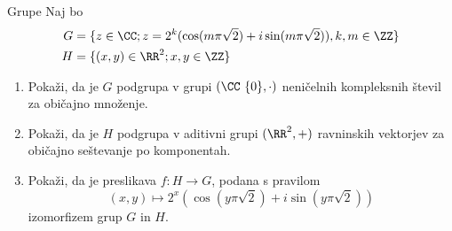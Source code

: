 \begin{frame}{Grupe}
	Naj bo
	\begin{align*}
		G &= \{z\in \CC; z = 2^k (\cos(m\pi\sqrt{2})+ i\sin(m\pi\sqrt{2})),k,m\in \ZZ\}\\
	    H &= \{(x,y) \in \RR^2; x,y \in \ZZ\}
	\end{align*}
	\begin{enumerate}
		\item
			Pokaži, da je $G$ podgrupa v grupi \((\CC \ \{0\}, \cdot)\)
			neničelnih kompleksnih števil za običajno množenje.
		\item
			Pokaži, da je $H$ podgrupa v aditivni grupi \((\RR^2, +)\)
			ravninskih vektorjev za običajno seštevanje po komponentah.
		\item
			Pokaži, da je preslikava $f:H\to G$, podana s pravilom
			\[(x,y) \mapsto 2^x (\cos(y\pi \sqrt{2})+ i\sin(y\pi \sqrt{2})) \]
			izomorfizem grup $G$ in $H$.
	\end{enumerate}
\end{frame}
